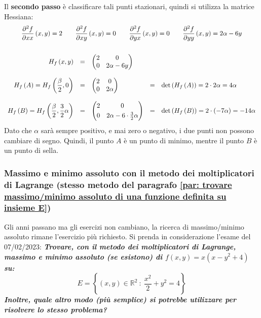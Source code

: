 \documentclass[a4paper]{article}
\makeatletter
\newenvironment{rowequmat}[1]{\left(\array{@{}#1@{}}}{\endarray\right)}
\makeatother
\begin{document}
	\noindent
	Il \textbf{secondo passo} è classificare tali punti stazionari, quindi si utilizza la matrice Hessiana:
	\begin{gather*}
		\dfrac{\partial^{2} f}{\partial xx}\left(x,y\right) = 2
		\hspace{2em}
		\dfrac{\partial^{2} f}{\partial xy}\left(x,y\right) = 0
		\hspace{2em}
		\dfrac{\partial^{2} f}{\partial yx}\left(x,y\right) = 0
		\hspace{2em}
		\dfrac{\partial^{2} f}{\partial yy}\left(x,y\right) = 2\alpha - 6y \\
		\\
		\begin{array}{rclcl}
			H_{f}\left(x,y\right) &=& \begin{pmatrix}
				2 & 0 \\ 0 & 2\alpha - 6y
			\end{pmatrix} && \\
			\\
			H_{f}\left(A\right) = H_{f}\left(\dfrac{\beta}{2}, 0\right) &=& \begin{pmatrix}
				2 & 0 \\ 0 & 2\alpha
			\end{pmatrix} &=& \det\left(H_{f}\left(A\right)\right) = 2 \cdot 2\alpha = 4\alpha \\
			\\
			H_{f}\left(B\right) = H_{f}\left(\dfrac{\beta}{2}, \dfrac{3}{2}\alpha\right) &=& \begin{rowequmat}{cc}
				2 & 0 \\ [.3em]
				0 & 2\alpha - 6\cdot\frac{3}{2}\alpha
			\end{rowequmat} &=& \det\left(H_{f}\left(B\right)\right) = 2 \cdot \left(-7\alpha\right) = -14\alpha
		\end{array}
	\end{gather*}
	Dato che $\alpha$ sarà sempre positivo, e mai zero o negativo, i due punti non possono cambiare di segno. Quindi, il punto $A$ è un punto di minimo, mentre il punto $B$ è un punto di sella.\newpage

	\subsubsection{Massimo e minimo assoluto con il metodo dei moltiplicatori di Lagrange (stesso metodo del paragrafo \ref{par: trovare massimo/minimo assoluto di una funzione definita su insieme E})}

	Gli anni passano ma gli esercizi non cambiano, la ricerca di massimo/minimo assoluto rimane l'esercizio più richiesto. Si prenda in considerazione l'esame del 07/02/2023: \textcolor{Green4}{\textbf{\emph{Trovare, con il metodo dei moltiplicatori di Lagrange, massimo e minimo assoluto (se esistono) di $f\left(x,y\right) = x\left(x-y^{2}+4\right)$ su:}}
	\begin{equation*}
		E = \left\{\left(x,y\right) \in \mathbb{R}^{2} \: : \: \dfrac{x^{2}}{2} + y^{2} = 4\right\}
	\end{equation*}
	\textbf{\emph{Inoltre, quale altro modo (più semplice) si potrebbe utilizzare per risolvere lo stesso problema?}}}\newline
\end{document}
